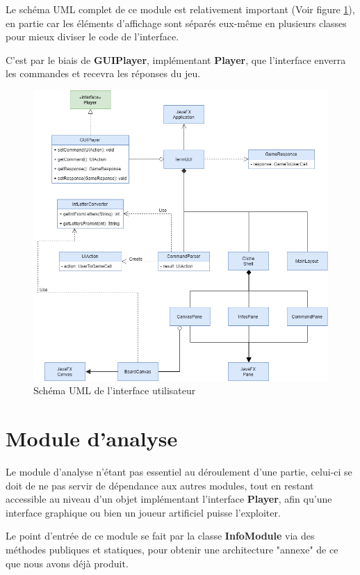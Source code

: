 \documentclass[a4paper]{report}
\begin{document}
Le schéma UML complet de ce module est relativement important (Voir figure \ref{uml:interface}), en partie car les éléments d'affichage sont séparés eux-même en plusieurs classes pour mieux diviser le code de l'interface.

C'est par le biais de \textbf{GUIPlayer}, implémentant \textbf{Player}, que l'interface enverra les commandes et recevra les réponses du jeu.
\begin{figure}[!h]
\includegraphics[width=1\textwidth]{UML/uml_interface.png}
\caption{Schéma UML de l'interface utilisateur}\label{uml:interface}
\centering
\end{figure}

\section{Module d'analyse}

Le module d'analyse n'étant pas essentiel au déroulement d'une partie, celui-ci se doit de ne pas servir de dépendance aux autres modules, tout en restant accessible au niveau d'un objet implémentant l'interface \textbf{Player}, afin qu'une interface graphique ou bien un joueur artificiel puisse l'exploiter.

Le point d'entrée de ce module se fait par la classe \textbf{InfoModule} via des méthodes publiques et statiques, pour obtenir une architecture "annexe" de ce que nous avons déjà produit.
\end{document}
